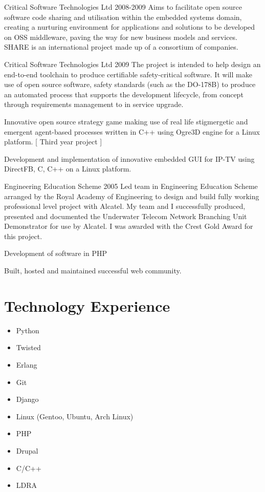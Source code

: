 \documentclass[overlapped,line,letterpaper]{res}
\begin{document}
\begin{resume}
  {Critical Software Technologies Ltd}
  {2008-2009}
{
    Aims to facilitate open source software code sharing and utilisation within
    the embedded systems domain, creating a nurturing environment for
    applications and solutions to be developed on OSS middleware, paving the way
    for new business models and services.
    SHARE is an international project made up of a consortium of companies.
}

  {Critical Software Technologies Ltd}
  {2009}
{
    The project is intended to help design an end-to-end toolchain to produce
    certifiable safety-critical software.
    It will make use of open source software, safety standards (such as the
    DO-178B) to produce an automated process that supports the development
    lifecycle, from concept through requirements management to in service
    upgrade.
}

{
    Innovative open source strategy game making use of real life stigmergetic
    and emergent agent-based processes written in C++ using Ogre3D engine for a
    Linux platform. [ Third year project ]
}

{
    Development and implementation of innovative embedded GUI for IP-TV using
    DirectFB, C, C++ on a Linux platform.
}

  {Engineering Education Scheme}
  {2005}
{
    Led team in Engineering Education Scheme arranged by the Royal Academy of
    Engineering to design and build fully working professional level project
    with Alcatel.
    My team and I successfully produced, presented and documented the Underwater
    Telecom Network Branching Unit Demonstrator for use by Alcatel.
    I was awarded with the Crest Gold Award for this project.
}

{
    Development of software in PHP
}

{
    Built, hosted and maintained successful web community.
}

\section{\bf{Technology Experience} }
\begin{itemize}
 \item Python
 \item Twisted
 \item Erlang
 \item Git
 \item Django
 \item Linux (Gentoo, Ubuntu, Arch Linux)
 \item PHP
 \item Drupal
 \item C/C++
 \item LDRA
\end{itemize}


\end{resume}
\end{document}
